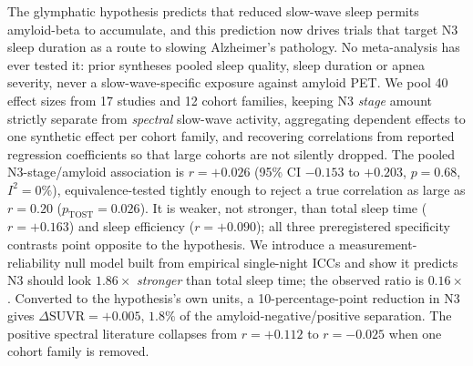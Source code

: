 The glymphatic hypothesis predicts that reduced slow-wave sleep permits amyloid-beta to
accumulate, and this prediction now drives trials that target N3 sleep duration as a route to
slowing Alzheimer's pathology. No meta-analysis has ever tested it: prior syntheses pooled
sleep quality, sleep duration or apnea severity, never a slow-wave-specific exposure against
amyloid PET. We pool 40 effect sizes from 17 studies and 12 cohort families, keeping N3
\emph{stage} amount strictly separate from \emph{spectral} slow-wave activity, aggregating
dependent effects to one synthetic effect per cohort family, and recovering correlations from
reported regression coefficients so that large cohorts are not silently dropped. The pooled
N3-stage/amyloid association is $r = +0.026$ (95\% CI $-0.153$ to $+0.203$, $p = 0.68$,
$I^2 = 0\%$), equivalence-tested tightly enough to reject a true correlation as large as
$r = 0.20$ ($p_{\mathrm{TOST}} = 0.026$). It is weaker, not stronger, than total sleep time
($r = +0.163$) and sleep efficiency ($r = +0.090$); all three preregistered specificity
contrasts point opposite to the hypothesis. We introduce a measurement-reliability null model
built from empirical single-night ICCs and show it predicts N3 should look $1.86\times$
\emph{stronger} than total sleep time; the observed ratio is $0.16\times$. Converted to the
hypothesis's own units, a 10-percentage-point reduction in N3 gives
$\Delta\mathrm{SUVR} = +0.005$, $1.8\%$ of the amyloid-negative/positive separation. The
positive spectral literature collapses from $r = +0.112$ to $r = -0.025$ when one cohort family
is removed.
